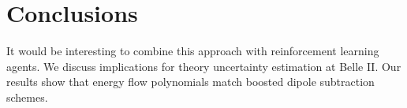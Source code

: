 \section{Conclusions}\label{sec:conclusions}

It would be interesting to combine this approach with reinforcement
learning agents. We discuss implications for theory uncertainty
estimation at Belle II. Our results show that energy flow polynomials
match boosted dipole subtraction schemes.

